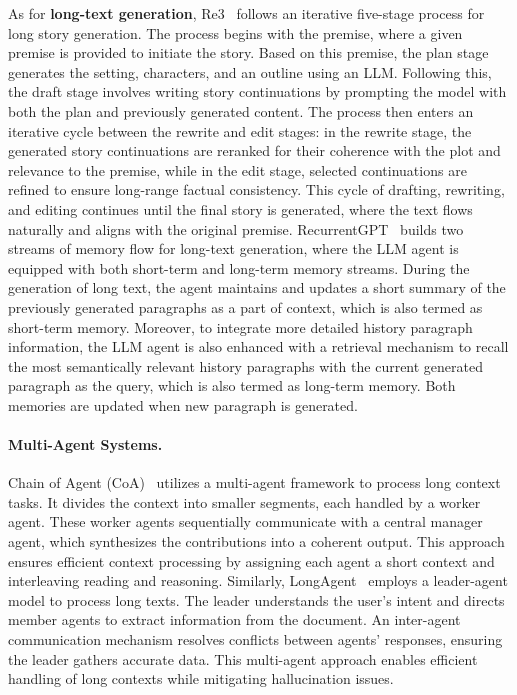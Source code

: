 \documentclass[11pt, a4paper, logo, copyright, nonumbering]{map}
\begin{document}
As for \textbf{long-text generation}, 
Re3~\citep{re3} follows an iterative five-stage process for long story generation. The process begins with the premise, where a given premise is provided to initiate the story. Based on this premise, the plan stage generates the setting, characters, and an outline using an LLM. Following this, the draft stage involves writing story continuations by prompting the model with both the plan and previously generated content. The process then enters an iterative cycle between the rewrite and edit stages: in the rewrite stage, the generated story continuations are reranked for their coherence with the plot and relevance to the premise, while in the edit stage, selected continuations are refined to ensure long-range factual consistency. This cycle of drafting, rewriting, and editing continues until the final story is generated, where the text flows naturally and aligns with the original premise. 
RecurrentGPT~\citep{recurrentgpt} builds two streams of memory flow for long-text generation, where the LLM agent is equipped with both short-term and long-term memory streams. During the generation of long text, the agent maintains and updates a short summary of the previously generated paragraphs as a part of context, which is also termed as short-term memory. Moreover, to integrate more detailed history paragraph information, the LLM agent is also enhanced with a retrieval mechanism to recall the most semantically relevant history paragraphs with the current generated paragraph as the query, which is also termed as long-term memory. Both memories are updated when new paragraph is generated.

\paragraph{Multi-Agent Systems.} 
Chain of Agent (CoA)~\citep{chain-of-agent} utilizes a multi-agent framework to process long context tasks. It divides the context into smaller segments, each handled by a worker agent. These worker agents sequentially communicate with a central manager agent, which synthesizes the contributions into a coherent output. This approach ensures efficient context processing by assigning each agent a short context and interleaving reading and reasoning. 
Similarly, LongAgent~\citep{longagent} employs a leader-agent model to process long texts. The leader understands the user’s intent and directs member agents to extract information from the document. An inter-agent communication mechanism resolves conflicts between agents’ responses, ensuring the leader gathers accurate data. This multi-agent approach enables efficient handling of long contexts while mitigating hallucination issues.
\end{document}
